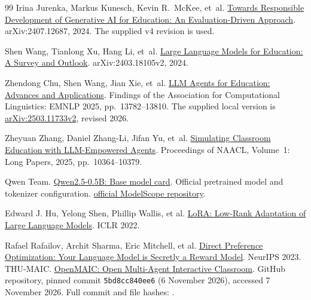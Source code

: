 \begin{thebibliography}{99}
Irina Jurenka, Markus Kunesch, Kevin R.~McKee, et~al.
\href{https://arxiv.org/abs/2407.12687v4}{Towards Responsible Development of Generative AI for Education: An Evaluation-Driven Approach}.
arXiv:2407.12687, 2024. The supplied v4 revision is used.

Shen Wang, Tianlong Xu, Hang Li, et~al.
\href{https://arxiv.org/abs/2403.18105v2}{Large Language Models for Education: A Survey and Outlook}.
arXiv:2403.18105v2, 2024.

Zhendong Chu, Shen Wang, Jian Xie, et~al.
\href{https://aclanthology.org/2025.findings-emnlp.743/}{LLM Agents for Education: Advances and Applications}.
Findings of the Association for Computational Linguistics: EMNLP 2025, pp.~13782--13810.
The supplied local version is \href{https://arxiv.org/abs/2503.11733v2}{arXiv:2503.11733v2}, revised 2026.

Zheyuan Zhang, Daniel Zhang-Li, Jifan Yu, et~al.
\href{https://aclanthology.org/2025.naacl-long.520/}{Simulating Classroom Education with LLM-Empowered Agents}.
Proceedings of NAACL, Volume~1: Long Papers, 2025, pp.~10364--10379.

Qwen Team. \href{https://huggingface.co/Qwen/Qwen2.5-0.5B}{Qwen2.5-0.5B: Base model card}. Official pretrained model and tokenizer configuration. \href{https://modelscope.cn/models/Qwen/Qwen2.5-0.5B}{official ModelScope repository}.

Edward J. Hu, Yelong Shen, Phillip Wallis, et al.
\href{https://arxiv.org/abs/2106.09685}{LoRA: Low-Rank Adaptation of Large Language Models}. ICLR 2022.

Rafael Rafailov, Archit Sharma, Eric Mitchell, et al.
\href{https://arxiv.org/abs/2305.18290}{Direct Preference Optimization: Your Language Model is Secretly a Reward Model}. NeurIPS 2023.
THU-MAIC. \href{https://github.com/THU-MAIC/OpenMAIC/tree/5bd8cc840ee6397d063e1fe6aba974b9f0401593}{OpenMAIC: Open Multi-Agent Interactive Classroom}. GitHub repository, pinned commit \texttt{5bd8cc840ee6} (6 November 2026), accessed 7 November 2026. Full commit and file hashes:  .


\end{thebibliography}

